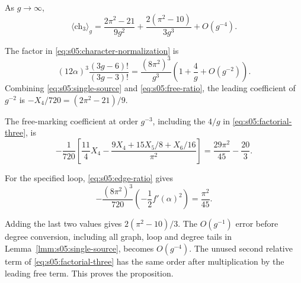 \begin{prp}\label{prp:s05:third-character}
As $g\to\infty$,
\begin{equation}\label{eq:s05:third-character}
 \langle\mathrm{ch}_3\rangle_g
 =\frac{2\pi^2-21}{9g^2}
       +\frac{2(\pi^2-10)}{3g^3}+O(g^{-4}).
\end{equation}
\end{prp}
\begin{prf}
The factor in \eqref{eq:s05:character-normalization} is
\begin{equation}\label{eq:s05:factorial-three}
 (12\alpha)^3\frac{(3g-6)!}{(3g-3)!}
 =\frac{(8\pi^2)^3}{g^3}
             \left(1+\frac4g+O(g^{-2})\right).
\end{equation}
Combining \eqref{eq:s05:single-source} and
\eqref{eq:s05:free-ratio}, the leading coefficient of $g^{-2}$
is $-X_4/720=(2\pi^2-21)/9$.

The free-marking coefficient at order $g^{-3}$, including the
$4/g$ in \eqref{eq:s05:factorial-three}, is
\begin{equation}\label{eq:s05:free-coefficient}
 -\frac1{720}\left[
 \frac{11}{4}X_4-
 \frac{9X_4+15X_5/8+X_6/16}{\pi^2}\right]
 =\frac{29\pi^2}{45}-\frac{20}{3}.
\end{equation}

For the specified loop, \eqref{eq:s05:edge-ratio} gives
\begin{equation}\label{eq:s05:loop-coefficient}
 -\frac{(8\pi^2)^3}{720}
           \left(-\frac12f'(\alpha)^2\right)=\frac{\pi^2}{45}.
\end{equation}

Adding the last two values gives $2(\pi^2-10)/3$.
The $O(g^{-1})$ error before degree conversion, including all graph,
loop and degree tails in Lemma~\ref{lmm:s05:single-source}, becomes
$O(g^{-4})$. The unused second relative term of
\eqref{eq:s05:factorial-three} has the same order after multiplication
by the leading free term. This proves the proposition.
\end{prf}
